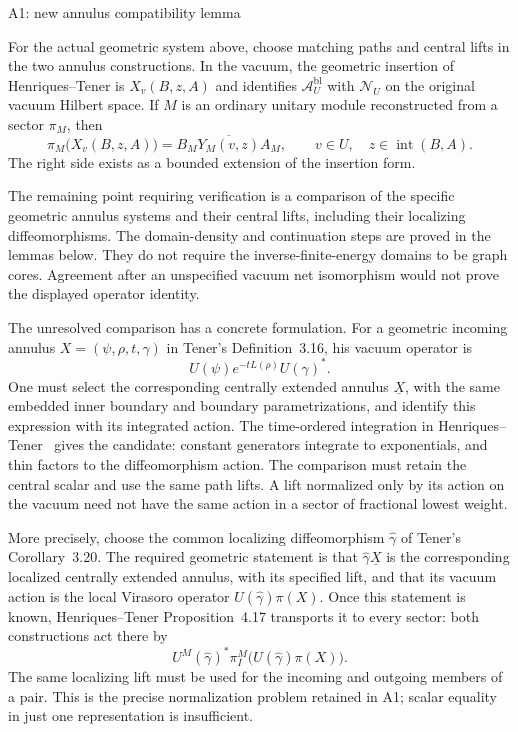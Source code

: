 \begin{criticalnote}{A1: new annulus compatibility lemma}
\begin{claim}
\label{clm:analytic-annulus}
For the actual geometric system above, choose matching paths and
central lifts in the two annulus constructions.  In the vacuum, the
geometric insertion of Henriques--Tener is $X_v(B,z,A)$ and identifies
$\mathcal A_U^{\mathrm{bl}}$ with $\mathcal N_U$ on the original
vacuum Hilbert space.  If $M$ is an ordinary
unitary module reconstructed from a sector $\pi_M$, then
\begin{equation}
 \pi_M\bigl(X_v(B,z,A)\bigr)
   =\overline{B_MY_M(v,z)A_M},
 \qquad v\in U,\quad z\in\operatorname{int}(B,A).
 \label{eq:analytic-annulus-identity}
\end{equation}
The right side exists as a bounded extension of the insertion form.
\end{claim}
The remaining point requiring verification is a comparison of the
specific geometric annulus systems and their central lifts, including
their localizing diffeomorphisms.  The domain-density and continuation
steps are proved in the lemmas below.  They do not require the
inverse-finite-energy domains to be graph cores.  Agreement after an
unspecified vacuum net isomorphism would not prove the displayed
operator identity.
\end{criticalnote}

The unresolved comparison has a concrete formulation.  For a geometric
incoming annulus $X=(\psi,\rho,t,\gamma)$ in Tener's Definition~3.16,
his vacuum operator is
\[
 U(\psi)e^{-tL(\rho)}U(\gamma)^*.
\]
One must select the corresponding centrally extended annulus
$\underline X$, with the same embedded inner boundary and boundary
parametrizations, and identify this expression with its integrated
action.  The time-ordered integration in
Henriques--Tener~\cite[Theorem~5.5 and formula~(5.2)]{HTAnn} gives the candidate:
constant generators integrate to exponentials, and thin factors to the
diffeomorphism action.  The comparison must retain the central scalar
and use the same path lifts.  A lift normalized only by its action on
the vacuum need not have the same action in a sector of fractional
lowest weight.

More precisely, choose the common localizing diffeomorphism
$\widehat\gamma$ of Tener's Corollary~3.20.  The required geometric
statement is that $\widehat\gamma\underline X$ is the corresponding
localized centrally extended annulus, with its specified lift, and
that its vacuum action is the local Virasoro operator
$U(\widehat\gamma)\pi(X)$.  Once this statement is known,
Henriques--Tener Proposition~4.17 transports it to every sector:
both constructions act there by
\[
 U^M(\widehat\gamma)^*
 \pi^M_I\bigl(U(\widehat\gamma)\pi(X)\bigr).
\]
The same localizing lift must be used for the incoming and outgoing
members of a pair.  This is the precise normalization problem retained
in A1; scalar equality in just one representation is insufficient.

